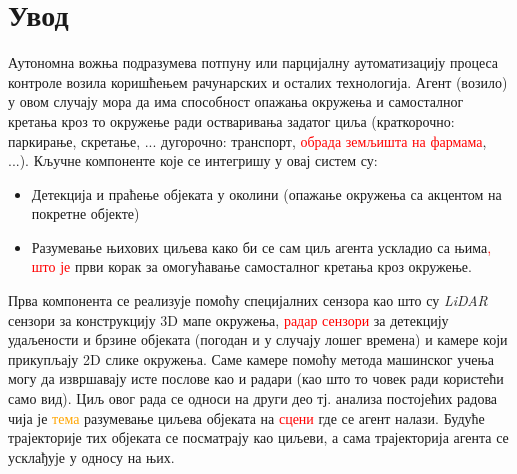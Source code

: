\documentclass[11pt,oneside]{memoir}
\begin{document}
\frontmatter
\naslovna
\komisija
\apstrakt
\tableofcontents*

\mainmatter

\chapter{Увод}

Аутономна вожња подразумева потпуну или парцијалну аутоматизацију процеса контроле возила коришћењем рачунарских и осталих технологија. Агент (возило) 
у овом случају мора да има способност опажања окружења и самосталног кретања кроз то окружење ради остваривања задатог циља 
(краткорочно: паркирање, скретање, ... дугорочно: транспорт, \textcolor{red}{обрада земљишта на фармама}, ...). Кључне
компоненте које се интегришу у овај систем су:
\begin{itemize} 
  \item Детекција и праћење објеката у околини (опажање окружења са акцентом на покретне објекте) 
  \item Разумевање њихових циљева како би се сам циљ агента ускладио са њима\textcolor{red}{, што је } 
        први корак за омогућавање самосталног кретања кроз окружење.
\end{itemize} 
Прва компонента се реализује помоћу специјалних сензора као што су \textit{LiDAR} сензори за конструкцију 3D мапе окружења, 
\textcolor{red}{радар сензори}
за детекцију удаљености и брзине објеката (погодан и у случају лошег времена) и камере који прикупљају 2D слике окружења. Саме камере помоћу
метода машинског учења могу да извршавају исте послове као и радари (као што то човек ради користећи само вид). Циљ овог рада се односи на други део
тј. анализа постојећих радова чија је \textcolor{orange}{тема} разумевање циљева објеката на \textcolor{red}{сцени} где се агент налази. Будуће трајекторије тих објеката се посматрају
као циљеви, а сама трајекторија агента се усклађује у односу на њих.
\end{document}
